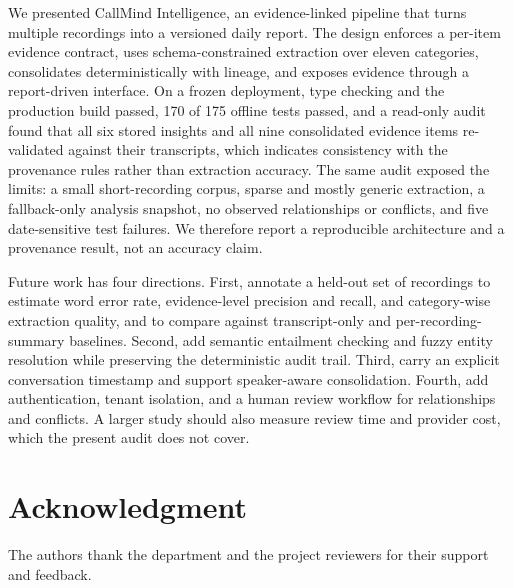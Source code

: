 \documentclass[conference,a4paper]{IEEEtran}
\begin{document}
We presented CallMind Intelligence, an evidence-linked pipeline that turns multiple
recordings into a versioned daily report. The design enforces a per-item evidence contract,
uses schema-constrained extraction over eleven categories, consolidates deterministically
with lineage, and exposes evidence through a report-driven interface. On a frozen
deployment, type checking and the production build passed, 170 of 175 offline tests passed,
and a read-only audit found that all six stored insights and all nine consolidated evidence
items re-validated against their transcripts, which indicates consistency with the
provenance rules rather than extraction accuracy. The same audit exposed the limits: a small
short-recording corpus, sparse and mostly generic extraction, a fallback-only analysis
snapshot, no observed relationships or conflicts, and five date-sensitive test failures.
We therefore report a reproducible architecture and a provenance result, not an accuracy
claim.

Future work has four directions. First, annotate a held-out set of recordings to estimate
word error rate, evidence-level precision and recall, and category-wise extraction quality,
and to compare against transcript-only and per-recording-summary baselines. Second, add
semantic entailment checking and fuzzy entity resolution while preserving the deterministic
audit trail. Third, carry an explicit conversation timestamp and support speaker-aware
consolidation. Fourth, add authentication, tenant isolation, and a human review workflow
for relationships and conflicts. A larger study should also measure review time and
provider cost, which the present audit does not cover.

\section*{Acknowledgment}

The authors thank the department and the project reviewers for their support and
feedback.



\end{document}
